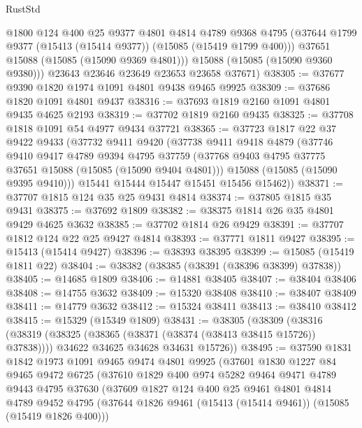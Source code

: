 \begin{lexlean}{RustStd}
\begin{coremodule}
          @1800
          @124
          @400
          @25
          @9377
          @4801
          @4814
          @4789
          @9368
          @4795
          (@37644 @1799 @9377 (@15413 (@15414 @9377)) (@15085 (@15419 @1799 @400)))
          @37651
          @15088
          (@15085 (@15090 @9369 @4801)))
        @15088
        (@15085 (@15090 @9360 @9380)))
      @23643
      @23646
      @23649
      @23653
      @23658
      @37671)
@38305 := @37677 @9390 @1820 @1974 @1091 @4801 @9438 @9465 @9925
@38309 := @37686 @1820 @1091 @4801 @9437
@38316 := @37693 @1819 @2160 @1091 @4801 @9435 @4625 @2193
@38319 := @37702 @1819 @2160 @9435
@38325 := @37708 @1818 @1091 @54 @4977 @9434 @37721
@38365 := @37723
    @1817
    @22
    @37
    @9422
    @9433
    (@37732
      @9411
      @9420
      (@37738
        @9411
        @9418
        @4879
        (@37746
          @9410
          @9417
          @4789
          @9394
          @4795
          @37759
          (@37768 @9403 @4795 @37775 @37651 @15088 (@15085 (@15090 @9404 @4801)))
          @15088
          (@15085 (@15090 @9395 @9410)))
        @15441
        @15444
        @15447
        @15451
        @15456
        @15462))
@38371 := @37707 @1815 @124 @35 @25 @9431 @4814
@38374 := @37805 @1815 @35 @9431
@38375 := @37692 @1809
@38382 := @38375 @1814 @26 @35 @4801 @9429 @4625 @3632
@38385 := @37702 @1814 @26 @9429
@38391 := @37707 @1812 @124 @22 @25 @9427 @4814
@38393 := @37771 @1811 @9427
@38395 := @15413 (@15414 @9427)
@38396 := @38393 @38395
@38399 := @15085 (@15419 @1811 @22)
@38404 := @38382 (@38385 (@38391 (@38396 @38399) @37838))
@38405 := @14685 @1809
@38406 := @14881 @38405
@38407 := @38404 @38406
@38408 := @14755 @3632
@38409 := @15320 @38408
@38410 := @38407 @38409
@38411 := @14779 @3632
@38412 := @15324 @38411
@38413 := @38410 @38412
@38415 := @15329 (@15349 @1809)
@38431 := @38305
    (@38309
      (@38316
        (@38319 (@38325 (@38365 (@38371 (@38374 (@38413 @38415 @15726)) @37838))))
        @34622
        @34625
        @34628
        @34631
        @15726))
@38495 := @37590
    @1831
    @1842
    @1973
    @1091
    @9465
    @9474
    @4801
    @9925
    (@37601
      @1830
      @1227
      @84
      @9465
      @9472
      @6725
      (@37610
        @1829
        @400
        @974
        @5282
        @9464
        @9471
        @4789
        @9443
        @4795
        @37630
        (@37609
          @1827
          @124
          @400
          @25
          @9461
          @4801
          @4814
          @4789
          @9452
          @4795
          (@37644 @1826 @9461 (@15413 (@15414 @9461)) (@15085 (@15419 @1826 @400)))

\end{coremodule}
\end{lexlean}
